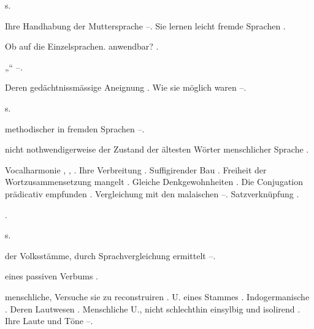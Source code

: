 \begin{register}
 s. 

 Ihre Handhabung der Muttersprache \pageref{sp.45}–\pageref{sp.46}. Sie lernen leicht fremde Sprachen \pageref{sp.67}.



 Ob auf die Einzelsprachen. anwendbar? \pageref{sp.58}.

„“ \pageref{sp.126}–\pageref{sp.127}.

 Deren gedächtnissmässige Aneignung \pageref{sp.64}. Wie sie möglich waren \pageref{sp.211}–\pageref{sp.212}. 

 s. 

 methodischer in fremden Sprachen \pageref{sp.71}–\pageref{sp.75}.

 nicht nothwendigerweise der Zustand der ältesten Wörter menschlicher Sprache \pageref{sp.255}.


 Vocalharmonie \pageref{sp.132}, \pageref{sp.199},  \sed{\pageref{sp.402}}. Ihre Verbreitung \pageref{sp.142}. Suffigirender Bau \pageref{sp.149}. Freiheit der Wortzusammensetzung mangelt \pageref{sp.236}. Gleiche Denkgewohnheiten \pageref{sp.293}.  Die Conjugation prädicativ empfunden \pageref{sp.391}.  Vergleichung mit den malaischen \pageref{sp.415}–\pageref{sp.420}. Satzverknüpfung \pageref{sp.465}.

 \pageref{sp.141}.


 s. 

 der Volksstämme, durch Sprachvergleichung ermittelt \pageref{sp.293}–\pageref{sp.294}.

 eines passiven Verbums \pageref{sp.102}.

 menschliche, Versuche sie zu reconstruiren \pageref{sp.67}. U. eines Stammes \pageref{sp.141}. Indogermanische \pageref{sp.184}. Deren Lautwesen \pageref{sp.186}.  Menschliche U., nicht schlechthin einsylbig und isolirend \pageref{sp.255}\sed{, \pageref{sp.314}}. Ihre Laute und Töne \pageref{sp.313}–\pageref{sp.315}.


\end{register}
